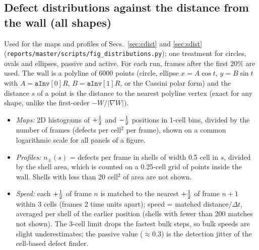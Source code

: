 \subsection{Defect distributions against the distance from the wall (all shapes)}\label{sec:m-dist}
Used for the maps and profiles of Secs.~\ref{sec:cdist} and \ref{sec:sdist}
(\texttt{reports/master/scripts/fig\_distributions.py}); one treatment for circles, ovals and ellipses, passive and active.
For each run, frames after the first 20\% are used. The wall is a polyline of 6000 points (circle, ellipse
$x=A\cos t$, $y=B\sin t$ with $A=\texttt{aInv}[0]R$, $B=\texttt{aInv}[1]R$, or the Cassini polar form) and the distance
$s$ of a point is the distance to the nearest polyline vertex (exact for any shape, unlike the first-order $-W/|\nabla W|$).
\begin{itemize}
  \item \emph{Maps:} 2D histograms of $+\tfrac12$ and $-\tfrac12$ positions in 1-cell bins, divided by the number of frames
        (defects per cell$^2$ per frame), shown on a common logarithmic scale for all panels of a figure.
  \item \emph{Profiles:} $n_\pm(s)$ = defects per frame in shells of width 0.5 cell in $s$, divided by the shell area, which
        is counted on a 0.25-cell grid of points inside the wall. Shells with less than 20 cell$^2$ of area are not shown.
  \item \emph{Speed:} each $+\tfrac12$ of frame $n$ is matched to the nearest $+\tfrac12$ of frame $n+1$ within 3 cells (frames
        2 time units apart); speed = matched distance$/\Delta t$, averaged per shell of the earlier position (shells with fewer
        than 200 matches not shown). The 3-cell limit drops the fastest bulk steps, so bulk speeds are slight underestimates; the
        passive value ($\approx0.3$) is the detection jitter of the cell-based defect finder.
\end{itemize}

